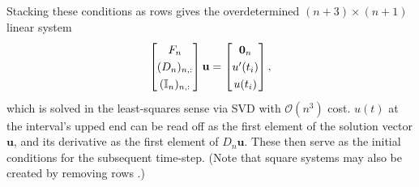 \documentclass[10pt]{article}
\newcommand{\be}{\begin{equation}}
\newcommand{\ee}{\end{equation}}
\newcommand{\eg}{{\it e.g.\ }}
\newcommand{\mbf}[1]{{\mathbf #1}}
\newcommand{\bigO}{{\mathcal O}}
\begin{document}
Stacking these conditions as rows gives the overdetermined $(n+3) \times (n+1)$ linear system
\be\label{discreteodeic}
\renewcommand*{\arraystretch}{1.25}
\begin{bmatrix}
    F_n \\
    (D_n)_{n,:} \\
    (\mathbb{I}_n)_{n,:}
\end{bmatrix}
\mbf{u}
= 
\begin{bmatrix}
\mbf{0}_n \\
    u'(t_i) \\
    u(t_i)
\end{bmatrix},
\ee
which is solved in the least-squares sense via SVD with $\bigO(n^3)$ cost.
$u(t)$ at the interval's upped end can be read off as the first element of the
solution vector $\mbf{u}$, and its derivative as the first element of
$D_n\mbf{u}$.
These then serve as the initial conditions for the subsequent time-step.
(Note that square systems may also be created by removing rows \cite{tref}.)
\end{document}
